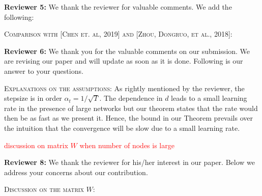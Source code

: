 \documentclass{article} %
\begin{document}
\textbf{Reviewer 5:}
We thank the reviewer for valuable comments. We add the following: \vspace{-4pt}




\textsc{Comparison with [Chen et. al, 2019] and [Zhou, Dongruo, et al., 2018]:}



\textbf{Reviewer 6:}
We thank you for the valuable comments on our submission. We are revising our paper and will update as soon as it is done. Following is our answer to your questions. \vspace{-4pt}


\textsc{Explanations on the assumptions:}
As rightly mentioned by the reviewer, the stepsize is in order $\alpha_t = 1/\sqrt{T}$. The dependence in $d$ leads to a small learning rate in the presence of large networks but our theorem states that the rate would then be as fast as we present it. 
Hence, the bound in our Theorem prevails over the intuition that the convergence will be slow due to a small learning rate.

\textcolor{red}{discussion on matrix $W$ when number of nodes is large}






\textbf{Reviewer 8:} 
We thank the reviewer for his/her interest in our paper. Below we address your concerns about our contribution. \vspace{-4pt}


\textsc{Discussion on the matrix $W$:}
\end{document}
